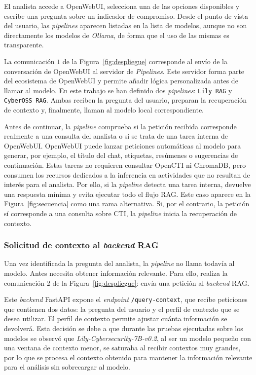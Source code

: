 \documentclass[12pt]{report}
\newcommand{\pipelines}{\textit{Pipelines}}
\begin{document}
El analista accede a OpenWebUI, selecciona una de las opciones disponibles y escribe una pregunta sobre un indicador de compromiso. Desde el punto de vista del usuario, las \textit{pipelines} aparecen listadas en la lista de modelos, aunque no son directamente los modelos de \textit{Ollama}, de forma que el uso de las mismas es transparente.

La comunicación $1$ de la Figura~\ref{fig:despliegue} corresponde al envío de la conversación de OpenWebUI al servidor de \pipelines. Este servidor forma parte del ecosistema de OpenWebUI y permite añadir lógica personalizada antes de llamar al modelo. En este trabajo se han definido dos \textit{pipelines}: \texttt{Lily RAG} y \texttt{CyberOSS RAG}. Ambas reciben la pregunta del usuario, preparan la recuperación de contexto y, finalmente, llaman al modelo local correspondiente.

Antes de continuar, la \textit{pipeline} comprueba si la petición recibida corresponde realmente a una consulta del analista o si se trata de una tarea interna de OpenWebUI. OpenWebUI puede lanzar peticiones automáticas al modelo para generar, por ejemplo, el título del chat, etiquetas, resúmenes o sugerencias de continuación. Estas tareas no requieren consultar OpenCTI ni ChromaDB, pero consumen los recursos dedicados a la inferencia en actividades que no resultan de interés para el analista. Por ello, si la \textit{pipeline} detecta una tarea interna, devuelve una respuesta mínima y evita ejecutar todo el flujo RAG. Este caso aparece en la Figura~\ref{fig:secuencia} como una rama alternativa.  Si, por el contrario, la petición sí corresponde a una consulta sobre CTI, la \textit{pipeline} inicia la recuperación de contexto.

\subsubsection*{Solicitud de contexto al \textit{backend} RAG}

Una vez identificada la pregunta del analista, la \textit{pipeline} no llama todavía al modelo. Antes necesita obtener información relevante. Para ello, realiza la comunicación $2$ de la Figura~\ref{fig:despliegue}: envía una petición al \textit{backend} RAG.

Este \textit{backend} FastAPI expone el \textit{endpoint} \texttt{/query-context}, que recibe peticiones que contienen dos datos: la pregunta del usuario y el perfil de contexto que se desea utilizar. El perfil de contexto permite ajustar cuánta información se devolverá. Esta decisión se debe a que durante las pruebas ejecutadas sobre los modelos se observó que \textit{Lily-Cybersecurity-7B-v0.2}, al ser un modelo pequeño con una ventana de contexto menor, se saturaba al recibir contextos muy grandes, por lo que se procesa el contexto obtenido para mantener la información relevante para el análisis sin sobrecargar al modelo.
\end{document}
